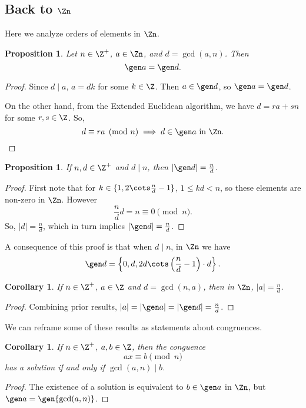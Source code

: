 \documentclass[12pt]{amsart}
\theoremstyle{plain}
\newtheorem{prop}[thm]{Proposition}
\newtheorem{cor}[thm]{Corollary}
\theoremstyle{definition}
\theoremstyle{remark}
\begin{document}
\subsection{Back to $\Zn$}\label{zn2}
Here we analyze orders of elements in $\Zn$.
\begin{prop} \label{imageszn}
  Let $n\in\Z^+$, $a\in \Zn$, and $d=\gcd(a,n)$.  Then
  \[ \gen a = \gen d.\]
\end{prop}
\begin{proof}
  Since $d\mid a$, $a=dk$ for some $k\in \Z$.  Then $a\in \gen d$, so
  $\gen a = \gen d$.

  On the other hand, from the Extended Euclidean algorithm, we have
  $d=ra+sn$ for some $r,s\in\Z$.  So, 
  \[ d\equiv ra\pmod n \implies d\in \gen a \text{ in $\Zn$.}\]
\end{proof}  
\begin{prop}
  If $n,d\in\Z^+$ and $d\mid n$, then $|\gen d|=\frac n d$.
\end{prop}
\begin{proof}
  First note that for $k\in \{1,2\cots \frac n d -1\}$, $1\leq kd <
  n$, so these elements are non-zero in $\Zn$.  However 
 \[ \frac n d d = n \equiv 0\pmod n.\]
  So, $|d|=\frac n d$, which in turn implies $|\gen d|=\frac n d$.
\end{proof}

  A consequence of this proof is that when $d\mid n$, in $\Zn$ we have
  \[ \gen d = \left\{0, d, 2d\cots \left(\frac n d-1\right) \cdot d\right\}.\]

\begin{cor}\label{ordercor}
  If $n\in\Z^+$, $a\in \Z$ and $d=\gcd(n,a)$, then in $\Zn$,
  $|a|=\frac nd$.
\end{cor}
\begin{proof}
  Combining prior results, $|a|=|\gen a| = |\gen d| = \frac nd$.
\end{proof}

We can reframe some of these results as statements about congruences.
\begin{cor}
  If $n\in\Z^+$, $a,b\in\Z$, then the conguence
  \[  ax\equiv b\pmod n\]
  has a solution if and only if $\gcd(a,n)\mid b$.
\end{cor}
\begin{proof}
  The existence of a solution is equivalent to $b\in\gen a$ in $\Zn$,
  but $\gen a = \gen{\gcd(a,n)}$.
\end{proof}
\end{document}
